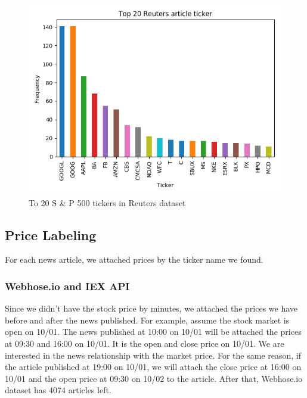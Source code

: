 \documentclass[sigconf]{acmart}
\begin{document}
\begin{figure}
  \includegraphics[width=\linewidth]{../../picture/reuter_ticker.png}
  \caption{To 20 S \& P 500 tickers in Reuters dataset}
  \label{fig:re_ticker}
\end{figure}

\subsection{Price Labeling}
For each news article, we attached prices by the ticker name we found.

\subsubsection{Webhose.io and IEX API}
Since we didn't have the stock price by minutes, we attached the prices we have before and after the news published. For example, assume the stock market is open on 10/01. The news published at 10:00 on 10/01
will be attached the prices at 09:30 and 16:00 on 10/01. It is the open and close price on 10/01. We are interested in the news relationship with the market price. For the same reason, if the
article published at 19:00 on 10/01, we will attach the close price at 16:00 on 10/01 and the open price at 09:30 on 10/02 to the article. After that, Webhose.io dataset has 4074 articles left.
\end{document}
